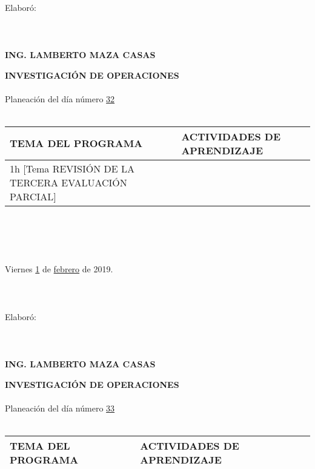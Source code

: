 \documentclass[landscape]{article}
\begin{document}
{\begin{center}
\ \\
Elabor\'o:
\ \\
\ \\
\ \\
\ \\
{\bf ING. LAMBERTO MAZA CASAS}
\end{center}
\eject
\begin{center}
{\bf 
INVESTIGACI\'ON DE OPERACIONES
}
\ \\
\ \\
Planeaci\'on del d\'ia n\'umero \underline{\hspace{0.5cm}32\hspace{0.5cm}}
\ \\
\ \\
\begin{tabular}{|p{11cm}|p{8cm}|}\hline
{\bf TEMA DEL PROGRAMA}&{\bf ACTIVIDADES DE APRENDIZAJE}\\\hline
	1h	[Tema REVISI\'ON DE LA TERCERA EVALUACI\'ON PARCIAL]
&\\
\hline
\end{tabular}
\ \\
\ \\
\ \\
\ \\
Viernes \underline{\hspace{0.5cm}1\hspace{0.5cm}} de  \underline{\hspace{0.5cm}febrero\hspace{0.5cm}} de 2019.
\ \\
\ \\
\ \\
\ \\
Elabor\'o:
\ \\
\ \\
\ \\
\ \\
{\bf ING. LAMBERTO MAZA CASAS}
\end{center}
\eject
\begin{center}
{\bf 
INVESTIGACI\'ON DE OPERACIONES
}
\ \\
\ \\
Planeaci\'on del d\'ia n\'umero \underline{\hspace{0.5cm}33\hspace{0.5cm}}
\ \\
\ \\
\begin{tabular}{|p{11cm}|p{8cm}|}\hline
{\bf TEMA DEL PROGRAMA}&{\bf ACTIVIDADES DE APRENDIZAJE}\\\hline

\end{tabular}
\end{center}}
\end{document}
